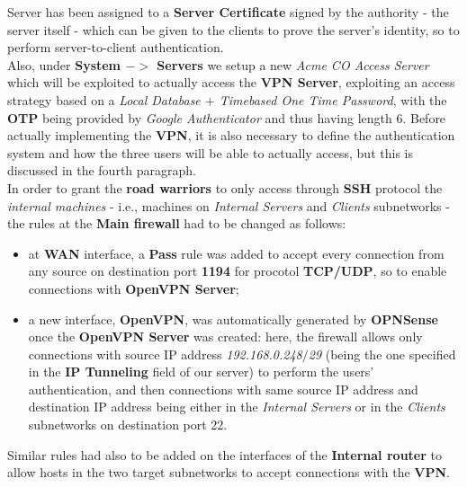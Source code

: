 Server has been assigned to a \textbf{Server Certificate} signed by the authority - the server itself - which can be given to the clients to prove the server's identity, so to perform server-to-client authentication.\\
Also, under \textbf{System $->$ Servers} we setup a new \textit{Acme CO Access Server} which will be exploited to actually access the \textbf{VPN Server}, exploiting an access strategy based on a \textit{Local Database $+$ Timebased One Time Password}, with the  \textbf{OTP} being provided by \textit{Google Authenticator} and thus having length 6. Before actually implementing the \textbf{VPN}, it is also necessary to define the authentication system and how the three users will be able to actually access, but this is discussed in the fourth paragraph.\\
In order to grant the \textbf{road warriors} to only access through \textbf{SSH} protocol the \textit{internal machines} - i.e., machines on \textit{Internal Servers} and \textit{Clients} subnetworks - the rules at the \textbf{Main firewall} had to be changed as follows:\\
\begin{itemize}
\item at \textbf{WAN} interface, a \textbf{Pass} rule was added to accept every connection from any source on destination port \textbf{1194} for procotol \textbf{TCP/UDP}, so to enable connections with \textbf{OpenVPN Server};
\item a new interface, \textbf{OpenVPN}, was automatically generated by \textbf{OPNSense} once the \textbf{OpenVPN Server} was created: here, the firewall allows only connections with source IP address \textit{192.168.0.248$/$29} (being the one specified in the \textbf{IP Tunneling} field of our server) to perform the users' authentication, and then connections with same source IP address and destination IP address being either in the \textit{Internal Servers} or in the \textit{Clients} subnetworks on destination port 22.
\end{itemize}

Similar rules had also to be added on the interfaces of the \textbf{Internal router} to allow hosts in the two target subnetworks to accept connections with the \textbf{VPN}.
